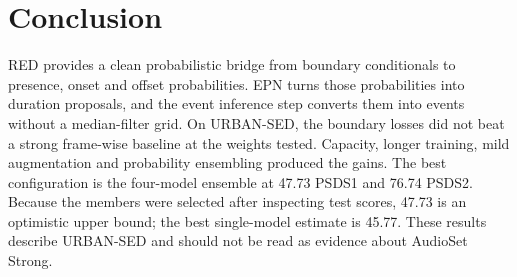 \section{Conclusion}

RED provides a clean probabilistic bridge from boundary conditionals to
presence, onset and offset probabilities. EPN turns those probabilities into
duration proposals, and the event inference step converts them into events
without a median-filter grid. On URBAN-SED, the boundary losses did not beat a strong
frame-wise baseline at the weights tested. Capacity, longer training, mild
augmentation and probability ensembling produced the gains. The best
configuration is the four-model ensemble at 47.73 PSDS1 and 76.74 PSDS2.
Because the members were selected after inspecting test scores, 47.73 is an
optimistic upper bound; the best single-model estimate is 45.77. These results describe URBAN-SED and should not be read as
evidence about AudioSet Strong.
